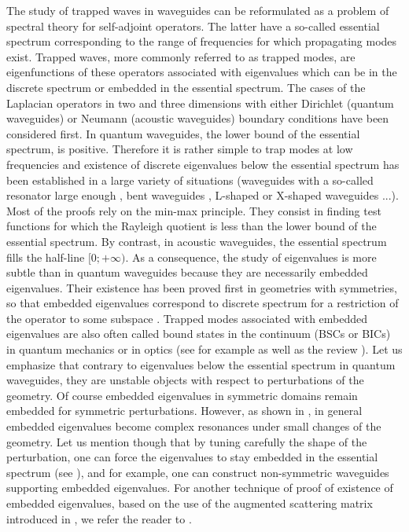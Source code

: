 \documentclass[11pt,a4paper]{article}
\begin{document}
The study of trapped waves in waveguides can be reformulated as  a problem of spectral theory for self-adjoint operators. The latter have a so-called essential spectrum corresponding to the range of frequencies for which propagating modes exist. Trapped waves, more commonly referred to as trapped modes, are  eigenfunctions of these operators associated with eigenvalues which can be in the discrete spectrum or embedded in the essential spectrum. The cases of the Laplacian operators in two and three dimensions with either Dirichlet (quantum waveguides) or Neumann (acoustic waveguides) boundary conditions have been considered first. In quantum waveguides, the lower bound of the essential spectrum, is positive. Therefore it is rather simple to trap modes at low frequencies and existence of discrete eigenvalues below the essential spectrum has been established in a large variety of situations (waveguides with a so-called resonator large enough \cite{na457}, bent waveguides \cite{DuEx95}, L-shaped or X-shaped waveguides \cite{ExSt89}...). Most of the proofs rely on the min-max principle. They consist in finding test functions for which the Rayleigh quotient is less than the lower bound of the essential spectrum. By contrast, in acoustic waveguides, the essential spectrum fills the half-line $[0;+\infty)$. As a consequence, the study of eigenvalues is more subtle than in quantum waveguides because they are necessarily embedded eigenvalues. Their existence has been proved first in geometries with symmetries, so that embedded eigenvalues correspond to discrete spectrum for a restriction of the operator to some subspace \cite{Wits90,Evan92,EvLV94,DaPa98,LiMc07}. Trapped modes associated with embedded eigenvalues are also often called bound states in the continuum (BSCs or BICs) in quantum mechanics or in optics (see for example \cite{SaBR06,Mois09,GPRO10,zhen2014topological,gomis2017anisotropy} as well as the review \cite{HZSJS16}). Let us emphasize that contrary to eigenvalues below the essential spectrum in quantum waveguides, they are unstable objects with respect to perturbations of the geometry. Of course embedded eigenvalues in symmetric domains remain embedded for symmetric perturbations. However, as shown in \cite{AsPV00}, in general embedded eigenvalues become complex resonances under small changes of the geometry. Let us mention though that by tuning carefully the shape of the perturbation, one can force the eigenvalues to stay embedded in the essential spectrum (see \cite{Naza13}), and for example, one can construct non-symmetric waveguides supporting embedded eigenvalues. For another technique of proof of existence of embedded eigenvalues, based on the use of the augmented scattering matrix introduced in \cite{KaNa02}, we refer the reader to \cite{ChPa18}.\\ 
\end{document}
